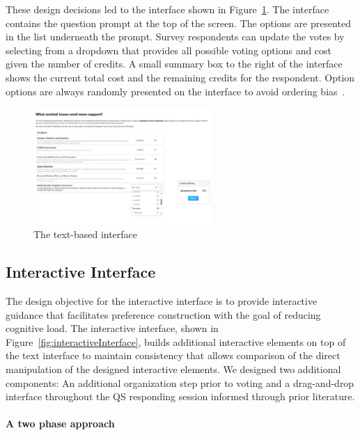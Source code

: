 These design decisions led to the interface shown in Figure~\ref{fig:textInterface}. The interface contains the question prompt at the top of the screen. The options are presented in the list underneath the prompt. Survey respondents can update the votes by selecting from a dropdown that provides all possible voting options and cost given the number of credits. A small summary box to the right of the interface shows the current total cost and the remaining credits for the respondent. Option options are always randomly presented on the interface to avoid ordering bias~\cite{ferberOrderBiasMail1952, couperWebSurveyDesign2001}.

\begin{figure}[H]
    \centering
    \includegraphics[width=0.6\textwidth]{content/image/text_interface.png}
    \caption{The text-based interface}
    \label{fig:textInterface}
\end{figure}

\subsection{Interactive Interface}
The design objective for the interactive interface is to provide interactive guidance that facilitates preference construction with the goal of reducing cognitive load. The interactive interface, shown in Figure~\ref{fig:interactiveInterface}, builds additional interactive elements on top of the text interface to maintain consistency that allows comparison of the direct manipulation of the designed interactive elements. We designed two additional components: An additional organization step prior to voting and a drag-and-drop interface throughout the QS responding session informed through prior literature.

\paragraph{A two phase approach}

